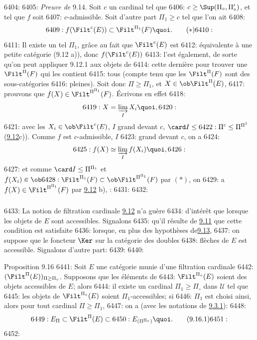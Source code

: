 6404: 
6405: \noindent \emph{Preuve de} 9.14. Soit $c$ un cardinal tel que
6406: $c\geq\Sup(\Pi_\circ, \Pi'_\circ)$, et tel que $f$ soit
6407: $c$-admissible. Soit d'autre part $\Pi_1\geq c$ tel que l'on ait
6408: \begin{equation}
6409: f(\Filt^c(E))\subset \Filt^{\Pi_1}(F){\quoi}.\tag{$\ast$}
6410: \end{equation}
6411: Il existe un tel $\Pi_1$, grâce au fait que $\Filt^c(E)$ est
6412: équivalente à une petite catégorie (9.12 a)), donc $f(\Filt^c(E))$
6413: l'est également, de sorte qu'on peut appliquer 9.12.1 aux objets de
6414: cette dernière pour trouver une $\Filt^{\Pi}(F)$ qui les contient %
6415: tous (compte tenu que les $\Filt^{\Pi}(F)$ sont des sous-catégories
6416: pleines). Soit donc $\Pi\geq \Pi_1$, et $X\in \ob \Filt^{\Pi}(E)$,
6417: prouvons que $f(X)\in \Filt^{\Pi^{\Pi_1}}(F)$. Écrivons en effet
6418: $$
6419: X=\varinjlim_I X_i{\quoi},
6420: $$
6421: avec les $X_i\in \ob \Filt^c(E)$, $I$ grand devant $c$, $\card I\leq
6422: \Pi^c\leq \Pi^{\Pi^1}$ (\hyperref[I.def9.12]{9.12}c)). Comme $f$ est $c$-admissible, $I$
6423: grand devant $c$, on a
6424: $$
6425: f(X)\simeq \varinjlim_I f(X_i){\quoi},
6426: $$
6427: et comme $\card I\leq \Pi^{\Pi_1}$ et $f(X_i)\in \ob
6428: \Filt^{\Pi_1}(F)\subset \ob \Filt^{\Pi^{\Pi_1}}(F)$ par $(\ast)$, on
6429: a $f(X)\in \Filt^{\Pi^{\Pi_1}}(F)$ par \hyperref[I.def9.12]{9.12} b), : 
6431: \setcounter{subsection}{15} \setcounter{subsubsection}{0}
6432: \subsubsection{}
6433: La notion de filtration cardinale \hyperref[I.def9.12]{9.12} n'a guère
6434: d'intérêt que lorsque les objets de $E$ sont accessibles. Signalons
6435: qu'il résulte de \hyperref[I.prop9.11]{9.11} que cette condition est satisfaite
6436: lorsque, en plus des hypothèses de\pageoriginale \hyperref[I.prop9.13]{9.13},
6437: on suppose que le foncteur $\Ker$ sur la catégorie des doubles
6438: flèches de $E$ est accessible. Signalons d'autre part:
6439: 
6440: \begin{enonce*}{Proposition 9.16}
6441: Soit $E$ une catégorie munie d'une filtration cardinale
6442: $(\Filt^{\Pi}(E))_{\Pi\geq\Pi_\circ}$. Supposons que les éléments de
6443: $\Filt^{\Pi_\circ}(E)$ soient des objets accessibles de $E$; alors
6444: il existe un cardinal $\Pi_1\geq\Pi_\circ$ dans $𝒰$ tel que
6445: les objets de $\Filt^{\Pi_\circ}(E)$ soient $\Pi_1$-accessibles; si
6446: $\Pi_1$ est choisi ainsi, alors pour tout cardinal $\Pi\geq \Pi_1$,
6447: on a (avec les notations de \hyperref[I.sec9.3.1]{9.3.1}):
6448: \begin{equation}
6449: E_{\Pi}\subset \Filt^{\Pi}(E)\subset
6450: E_{(\Pi^{\Pi_\circ})}{\quoi}.\tag{9.16.1}
6451: \end{equation}
6452: \end{enonce*}
